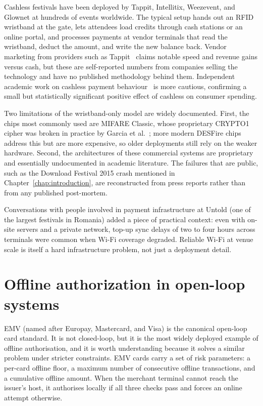 Cashless festivals have been deployed by Tappit, Intellitix, Weezevent, and Glownet at hundreds of events worldwide. The typical setup hands out an RFID wristband at the gate, lets attendees load credits through cash stations or an online portal, and processes payments at vendor terminals that read the wristband, deduct the amount, and write the new balance back. Vendor marketing from providers such as Tappit~\cite{Tappit2024} claims notable speed and revenue gains versus cash, but these are self-reported numbers from companies selling the technology and have no published methodology behind them. Independent academic work on cashless payment behaviour~\cite{Schomburgk2024} is more cautious, confirming a small but statistically significant positive effect of cashless on consumer spending.

Two limitations of the wristband-only model are widely documented. First, the chips most commonly used are MIFARE Classic, whose proprietary CRYPTO1 cipher was broken in practice by Garcia et al.~\cite{Garcia2008}; more modern DESFire chips address this but are more expensive, so older deployments still rely on the weaker hardware. Second, the architectures of these commercial systems are proprietary and essentially undocumented in academic literature. The failures that are public, such as the Download Festival 2015 crash mentioned in Chapter~\ref{chap:introduction}, are reconstructed from press reports rather than from any published post-mortem.

Conversations with people involved in payment infrastructure at Untold (one of the largest festivals in Romania) added a piece of practical context: even with on-site servers and a private network, top-up sync delays of two to four hours across terminals were common when Wi-Fi coverage degraded. Reliable Wi-Fi at venue scale is itself a hard infrastructure problem, not just a deployment detail.

\section{Offline authorization in open-loop systems}
\label{subsec:emv}

EMV (named after Europay, Mastercard, and Visa) is the canonical open-loop card standard. It is not closed-loop, but it is the most widely deployed example of offline authorisation, and it is worth understanding because it solves a similar problem under stricter constraints. EMV cards carry a set of risk parameters: a per-card offline floor, a maximum number of consecutive offline transactions, and a cumulative offline amount. When the merchant terminal cannot reach the issuer's host, it authorises locally if all three checks pass and forces an online attempt otherwise.

